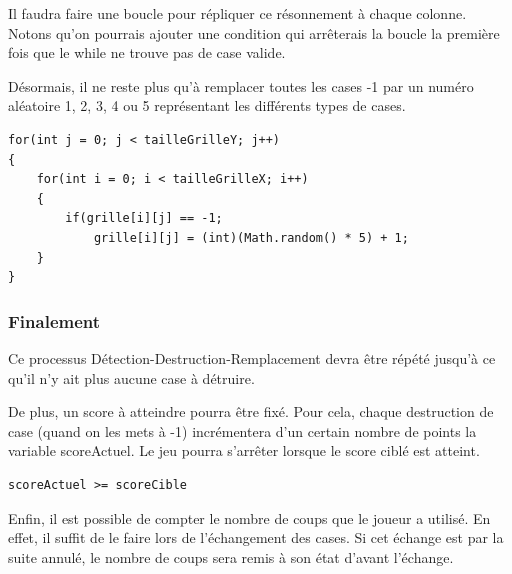 	Il faudra faire une boucle pour répliquer ce résonnement à chaque colonne. Notons qu'on pourrais ajouter une condition qui arrêterais la boucle la première fois que le while ne trouve pas de case valide.
	
	Désormais, il ne reste plus qu'à remplacer toutes les cases -1 par un numéro aléatoire 1, 2, 3, 4 ou 5 représentant les différents types de cases.

\begin{lstlisting}
for(int j = 0; j < tailleGrilleY; j++)
{
	for(int i = 0; i < tailleGrilleX; i++)
	{
		if(grille[i][j] == -1;
			grille[i][j] = (int)(Math.random() * 5) + 1;
	}
}
\end{lstlisting}

\subsubsection{Finalement}

Ce processus Détection-Destruction-Remplacement devra être répété jusqu'à ce qu'il n'y ait plus aucune case à détruire.

De plus, un score à atteindre pourra être fixé. Pour cela, chaque destruction de case (quand on les mets à -1) incrémentera d'un certain nombre de points la variable scoreActuel. Le jeu pourra s'arrêter lorsque le score ciblé est atteint.
\begin{lstlisting}
scoreActuel >= scoreCible
\end{lstlisting}

Enfin, il est possible de compter le nombre de coups que le joueur a utilisé. En effet, il suffit de le faire lors de l'échangement des cases. Si cet échange est par la suite annulé, le nombre de coups sera remis à son état d'avant l'échange.